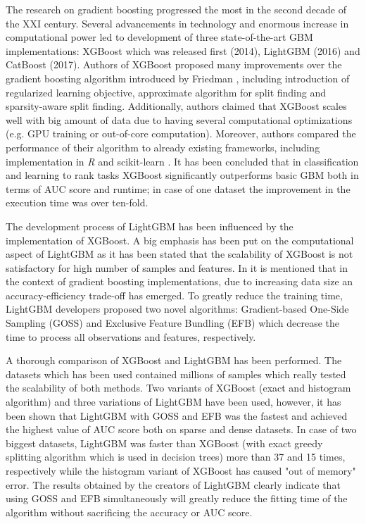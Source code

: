 \documentclass[magisterska, english]{pwr_wmat_praca_dyplomowa}
\theoremstyle{plain}
\numberwithin{theorem}{chapter}
\theoremstyle{definition}
\numberwithin{theorem}{chapter}
\begin{document}
The research on gradient boosting progressed the most in the second decade of the XXI century. Several advancements in technology and enormous increase in computational power led to development of three state-of-the-art GBM implementations: XGBoost \cite{xgboost} which was released first (2014), LightGBM \cite{lightgbm} (2016) and CatBoost \cite{catboost} (2017). Authors of XGBoost \cite{xgboost} proposed many improvements over the gradient boosting algorithm introduced by Friedman \cite{friedman_gbm}, including introduction of regularized learning objective, approximate algorithm for split finding and sparsity-aware split finding. Additionally, authors claimed that XGBoost scales well with big amount of data due to having several computational optimizations (e.g. GPU training or out-of-core computation). Moreover, authors compared the performance of their algorithm to already existing frameworks, including implementation in \emph{R} and scikit-learn \cite{sklearn}. It has been concluded that in classification and learning to rank tasks XGBoost significantly outperforms basic GBM both in terms of AUC score and runtime; in case of one dataset the improvement in the execution time was over ten-fold.

The development process of LightGBM \cite{lightgbm} has been influenced by the implementation of XGBoost. A big emphasis has been put on the computational aspect of LightGBM as it has been stated that the scalability of XGBoost is not satisfactory for high number of samples and features. In \cite{lightgbm} it is mentioned that in the context of gradient boosting implementations, due to increasing data size an accuracy-efficiency trade-off has emerged. To greatly reduce the training time, LightGBM developers proposed two novel algorithms: Gradient-based One-Side Sampling (GOSS) and Exclusive Feature Bundling (EFB) which decrease the time to process all observations and features, respectively.

A thorough comparison of XGBoost and LightGBM has been performed. The datasets which has been used contained millions of samples which really tested the scalability of both methods. Two variants of XGBoost (exact and histogram algorithm) and three variations of LightGBM have been used, however, it has been shown that LightGBM with GOSS and EFB was the fastest and achieved the highest value of AUC score both on sparse and dense datasets. In case of two biggest datasets, LightGBM was faster than XGBoost (with exact greedy splitting algorithm which is used in decision trees) more than 37 and 15 times, respectively while the histogram variant of XGBoost has caused "out of memory" error. The results obtained by the creators of LightGBM clearly indicate that using GOSS and EFB simultaneously will greatly reduce the fitting time of the algorithm without sacrificing the accuracy or AUC score.
\end{document}

